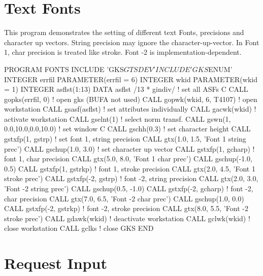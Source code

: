 \section{Text Fonts}
 
This program demonstrates the setting of different
text Fonts, precisions and character up vectors.
String precision may ignore the character-up-vector.
In Font 1, char precision is treated like stroke.
Font -2 is implementation-dependent.
\begin{XMP}
      PROGRAM   FONTS
      INCLUDE  'GKS$GTSDEV'
      INCLUDE  'GKS$ENUM'
      INTEGER   errfil
      PARAMETER(errfil = 6)
      INTEGER   wkid
      PARAMETER(wkid = 1)
      INTEGER   asflst(1:13)
      DATA      asflst /13 * gindiv/  ! set all ASFs
C
      CALL gopks(errfil, 0)           ! open gks (BUFA not used)
      CALL gopwk(wkid, 6, T4107)      ! open workstation
      CALL gsasf(asflst)              ! set attributes individually
      CALL gacwk(wkid)                ! activate workstation
      CALL gselnt(1)                  ! select norm transf.
      CALL gswn(1, 0.0,10.0,0.0,10.0) ! set window
C
      CALL gschh(0.3)                 ! set character height
      CALL gstxfp(1, gstrp)           ! set font 1, string precision
      CALL gtx(1.0, 1.5, 'Font 1 string prec')
      CALL gschup(1.0, 3.0)           ! set character up vector
      CALL gstxfp(1, gcharp)          ! font 1, char precision
      CALL gtx(5.0, 8.0, 'Font 1 char prec')
      CALL gschup(-1.0, 0.5)
      CALL gstxfp(1, gstrkp)          ! font 1, stroke precision
      CALL gtx(2.0, 4.5, 'Font 1 stroke prec')
      CALL gstxfp(-2, gstrp)          ! font -2, string precision
      CALL gtx(2.0, 3.0, 'Font -2 string prec')
      CALL gschup(0.5, -1.0)
      CALL gstxfp(-2, gcharp)         ! font -2, char precision
      CALL gtx(7.0, 6.5, 'Font -2 char prec')
      CALL gschup(1.0, 0.0)
      CALL gstxfp(-2, gstrkp)         ! font -2, stroke precision
      CALL gtx(8.0, 5.5, 'Font -2 stroke prec')
      CALL gdawk(wkid)                ! deactivate workstation
      CALL gclwk(wkid)                ! close workstation
      CALL gclks                      ! close GKS
      END\end{XMP}
\section{Request Input}
 
